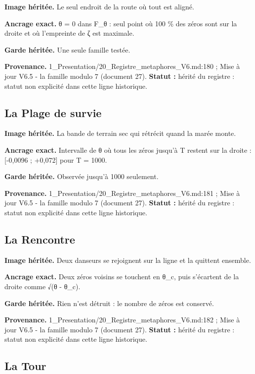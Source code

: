 \documentclass[
  9pt,
  a4paper,
]{article}
\begin{document}
\textbf{Image héritée.} Le seul endroit de la route où tout est aligné.

\textbf{Ancrage exact.} θ = 0 dans F\_θ : seul point où 100 \% des zéros
sont sur la droite et où l'empreinte de ζ est maximale.

\textbf{Garde héritée.} Une seule famille testée.

\textbf{Provenance.} 1\_Presentation/20\_Registre\_metaphores\_V6.md:180
; Mise à jour V6.5 - la famille modulo 7 (document 27). \textbf{Statut
:} hérité du registre : statut non explicité dans cette ligne
historique.

\hypertarget{la-plage-de-survie}{%
\subsection{La Plage de survie}\label{la-plage-de-survie}}

\textbf{Image héritée.} La bande de terrain sec qui rétrécit quand la
marée monte.

\textbf{Ancrage exact.} Intervalle de θ où tous les zéros jusqu'à T
restent sur la droite : {[}-0,0096 ; +0,072{]} pour T = 1000.

\textbf{Garde héritée.} Observée jusqu'à 1000 seulement.

\textbf{Provenance.} 1\_Presentation/20\_Registre\_metaphores\_V6.md:181
; Mise à jour V6.5 - la famille modulo 7 (document 27). \textbf{Statut
:} hérité du registre : statut non explicité dans cette ligne
historique.

\hypertarget{la-rencontre}{%
\subsection{La Rencontre}\label{la-rencontre}}

\textbf{Image héritée.} Deux danseurs se rejoignent sur la ligne et la
quittent ensemble.

\textbf{Ancrage exact.} Deux zéros voisins se touchent en θ\_c, puis
s'écartent de la droite comme √(θ - θ\_c).

\textbf{Garde héritée.} Rien n'est détruit : le nombre de zéros est
conservé.

\textbf{Provenance.} 1\_Presentation/20\_Registre\_metaphores\_V6.md:182
; Mise à jour V6.5 - la famille modulo 7 (document 27). \textbf{Statut
:} hérité du registre : statut non explicité dans cette ligne
historique.

\hypertarget{la-tour}{%
\subsection{La Tour}\label{la-tour}}
\end{document}

